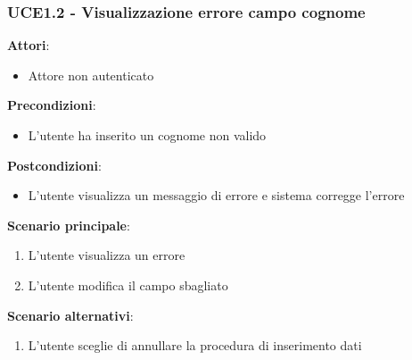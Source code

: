 \subsubsection{UCE1.2 - Visualizzazione errore campo cognome}
\textbf{Attori}:
\begin{itemize}
    \item Attore non autenticato
\end{itemize}
\textbf{Precondizioni}:
\begin{itemize}
    \item L'utente ha inserito un cognome non valido
\end{itemize}
\textbf{Postcondizioni}:
\begin{itemize}
    \item L'utente visualizza un messaggio di errore e sistema corregge l'errore
\end{itemize}
\textbf{Scenario principale}:
\begin{enumerate}
    \item L'utente visualizza un errore 
    \item L'utente modifica il campo sbagliato
\end{enumerate}
\textbf{Scenario alternativi}:
\begin{enumerate}
    \item L'utente sceglie di annullare la procedura di inserimento dati
\end{enumerate}